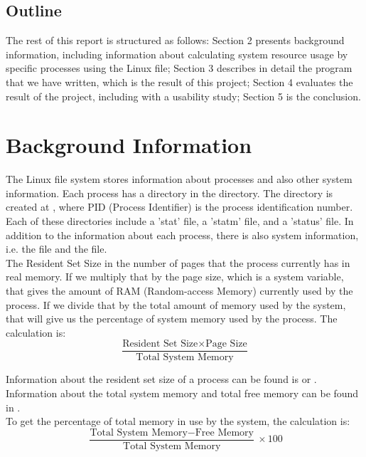 \documentclass[12pt]{article}
\begin{document}
	\subsection{Outline}
	The rest of this report is structured as follows: Section 2 presents background information, including information about calculating system resource usage by specific processes using the Linux  file; Section 3 describes in detail the program that we have written, which is the result of this project; Section 4 evaluates the result of the project, including with a usability study; Section 5 is the conclusion.
	
	\section{Background Information}
	The Linux  file system stores information about processes and also other system information.
Each process has a directory in the  directory\cite[p. 792]{text}.
The directory is created at , where PID (Process Identifier) is the process identification number. Each of these directories include a 'stat' file, a 'statm' file, and a 'status' file. In addition to the information about each process, there is also system information, i.e. the  file and the  file.\\
	The Resident Set Size in the number of pages that the process currently has in real memory.
	If we multiply that by the page size, which is a system variable, that gives the amount of RAM (Random-access Memory) currently used by the process.
	If we divide that by the total amount of memory used by the system, that will give us the percentage of system memory used by the process.
	The calculation is:\\
	$$ \frac{\text{Resident Set Size} \times \text{Page Size}}{\text{Total System Memory}} $$
	
	Information about the resident set size of a process can be found is  or \cite{manProc}.
	Information about the total system memory and total free memory can be found in  \cite{manProc}.\\
	To get the percentage of total memory in use by the system, the calculation is:\\
	$$ \frac{\text{Total System Memory} - \text{Free Memory}}{\text{Total System Memory}} \times 100 $$
	
\end{document}
